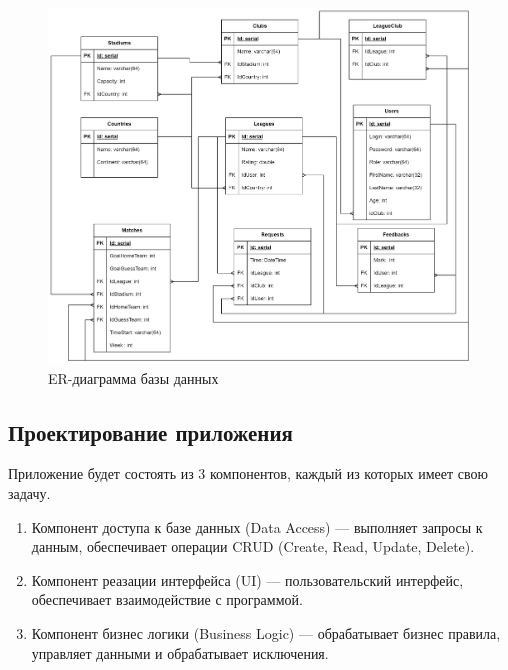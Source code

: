 \begin{figure}[h]
	\centering
	\includegraphics[height=0.5\textheight]{img/ERD.png}
	\caption{ER-диаграмма базы данных}
	\label{img:ERD}
\end{figure}
\clearpage
\subsection{Проектирование приложения}
Приложение будет состоять из 3 компонентов, каждый из которых имеет свою задачу.
\begin{enumerate}
	\item Компонент доступа к базе данных (Data Access) --- выполняет запросы к данным, обеспечивает операции CRUD (Create, Read, Update, Delete).
	\item Компонент реазации интерфейса (UI) --- пользовательский интерфейс, обеспечивает взаимодействие с программой.
	\item Компонент бизнес логики (Business Logic) --- обрабатывает бизнес правила, управляет данными и обрабатывает исключения.
\end{enumerate}

